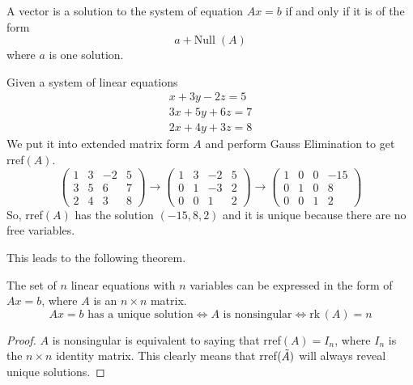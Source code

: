   \begin{theorem}
    \label{thm:form-of-the-general-solution}
    A vector is a solution to the system of equation $A x = b$ if and only if it is of the form 
    \begin{equation}
    a + \text{Null}\; (A)
    \end{equation}
    where $a$ is one solution. 
  \end{theorem}

  \begin{example}
    \label{ex:solving-a-system-by-row-reduction}
    Given a system of linear equations 
    \begin{align*}
      x + 3 y - 2z = 5 \\
      3 x + 5 y + 6 z = 7 \\
      2 x + 4 y + 3 z = 8
    \end{align*}
    We put it into extended matrix form $A$ and perform Gauss Elimination to get rref$(A)$. 
    \begin{equation}
      \begin{pmatrix}
      1 & 3&-2&5 \\ 3&5&6&7\\ 2&4&3&8
      \end{pmatrix} \rightarrow \begin{pmatrix}
      1&3&-2&5\\ 0&1&-3&2 \\ 0&0&1&2 \end{pmatrix} \rightarrow \begin{pmatrix}
      1&0&0&-15 \\ 0&1&0&8 \\ 0&0&1&2
      \end{pmatrix}
    \end{equation}
    So, rref$(A)$ has the solution $(-15, 8, 2)$ and it is unique because there are no free variables. 
  \end{example}

  This leads to the following theorem. 

  \begin{theorem}
    \label{thm:matrix-form-of-a-linear-system}
    The set of $n$ linear equations with $n$ variables can be expressed in the form of $A x = b$, where $A$ is an $n \times n$ matrix. 
    \begin{equation}
      A x = b \text{ has a unique solution} \iff A \text{ is nonsingular} \iff \text{rk}\,(A) = n
    \end{equation}
  \end{theorem}
  \begin{proof}
    $A$ is nonsingular is equivalent to saying that rref$(A) = I_n$, where $I_n$ is the $n \times n$ identity matrix. This clearly means that rref$(\Tilde{A})$ will always reveal unique solutions. 
  \end{proof}

